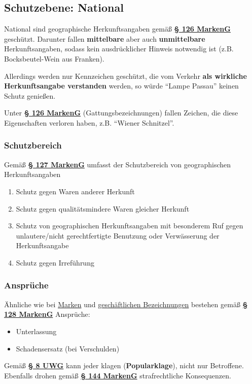 \documentclass[12pt,A4]{extarticle}
\newcommand{\markenG}[2][]{\textbf{\textcolor{markenGesetzLink}{\href{https://www.gesetze-im-internet.de/markeng/__#2.html}{§ #2 \ifthenelse{\equal{#1}{}}{}{#1 }MarkenG}}}}
\newcommand{\uwg}[2][]{\textbf{\textcolor{markenGesetzLink}{\href{https://www.gesetze-im-internet.de/uwg_2004/__#2.html}{§ #2 \ifthenelse{\equal{#1}{}}{}{#1 }UWG}}}}
\begin{document}
\subsection{Schutzebene: National}
National sind geographische Herkunftsangaben gemäß \markenG{126} geschützt. Darunter fallen \textbf{mittelbare} aber auch \textbf{unmittelbare} Herkunftsangaben, sodass kein ausdrücklicher Hinweis notwendig ist (z.B. Bocksbeutel-Wein aus Franken).\par
Allerdings werden nur Kennzeichen geschützt, die vom Verkehr \textbf{als wirkliche Herkunftsangabe verstanden} werden, so würde ``Lampe Passau'' keinen Schutz genießen.\par
Unter \markenG[Abs. 2]{126} (Gattungsbezeichnungen) fallen Zeichen, die diese Eigenschaften verloren haben, z.B. ``Wiener Schnitzel''.

\subsubsection{Schutzbereich}
Gemäß \markenG{127} umfasst der Schutzbereich von geographischen Herkunftsangaben
\begin{enumerate}
  \item{Schutz gegen Waren anderer Herkunft}
  \item{Schutz gegen qualitätsmindere Waren gleicher Herkunft}
  \item{Schutz von geographischen Herkunftsangaben mit besonderem Ruf gegen unlautere/nicht gerechtfertigte Benutzung oder Verwässerung der Herkunftsangabe}
  \item{Schutz gegen Irreführung}
\end{enumerate}

\subsubsection{Ansprüche}
Ähnliche wie bei \hyperref[sec:MarkenAnsprueche]{Marken} und \hyperref[sec:GeschaeftlicheBezeichnungenAnsprueche]{geschäftlichen Bezeichnungen} bestehen gemäß \markenG{128} Ansprüche:
\begin{itemize}
  \item{Unterlassung}
  \item{Schadensersatz (bei Verschulden)}
\end{itemize}
Gemäß \uwg[Abs. 3]{8} kann jeder klagen (\textbf{Popularklage}), nicht nur Betroffene. Ebenfalls drohen gemäß \markenG{144} strafrechtliche Konsequenzen.
\end{document}

